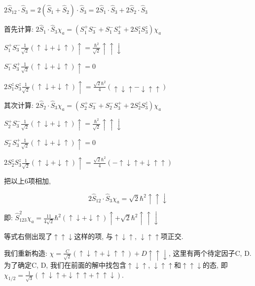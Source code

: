 $ 2 \hat S_{12}\cdot\hat S_3 = 2(\hat S_1 + \hat S_2) \cdot \hat S_3
= 2 \hat S_1 \cdot \hat S_3 + 2 \hat S_2 \cdot \hat S_3$

首先计算: $2 \hat S_1 \cdot \hat S_3 \chi_a =\left( S_1^+ S_3^- +
S_1^-S_3^+ + 2 S_1^z S_3^z \right) \chi_a$


$S_1^+ S_3^- \frac{1}{\sqrt 2}\left(
\uparrow\downarrow+\downarrow\uparrow \right) \uparrow  =
\frac{\hbar^2}{\sqrt 2} \uparrow \uparrow \downarrow$


$S_1^- S_3^+ \frac{1}{\sqrt 2}\left(
\uparrow\downarrow+\downarrow\uparrow \right) \uparrow = 0$

$2 S_1^z S_3^z \frac{1}{\sqrt 2}\left(
\uparrow\downarrow+\downarrow\uparrow \right) \uparrow = \frac{\sqrt
2 \hbar^2}{4} (\uparrow \downarrow \uparrow - \downarrow \uparrow
\uparrow ) $

其次计算: $2 \hat S_2 \cdot \hat S_3 \chi_a =\left( S_2^+ S_3^- +
S_2^-S_3^+ + 2 S_2^z S_3^z \right) \chi_a$

$S_2^+ S_3^- \frac{1}{\sqrt 2}\left(
\uparrow\downarrow+\downarrow\uparrow \right) \uparrow =
\frac{\hbar^2}{\sqrt 2} \uparrow \uparrow \downarrow$

$S_2^-S_3^+ \frac{1}{\sqrt 2}\left(
\uparrow\downarrow+\downarrow\uparrow \right) \uparrow =0 $

$2 S_2^z S_3^z \frac{1}{\sqrt 2}\left(
\uparrow\downarrow+\downarrow\uparrow \right) \uparrow = \frac{\sqrt
2 \hbar^2}{4} (- \uparrow \downarrow \uparrow + \downarrow \uparrow
\uparrow )$

把以上6项相加,

\begin{equation*}
2 \hat S_{12}\cdot \hat S_3 \chi_a = \sqrt 2 \hbar^2 \uparrow
\uparrow \downarrow
\end{equation*}

即: $\hat S_{123}^2 \chi_a = \frac{11}{4 \sqrt 2}\hbar^2 \left(
\uparrow\downarrow+\downarrow\uparrow \right) \uparrow + \sqrt 2
\hbar^2 \uparrow \uparrow \downarrow$

等式右侧出现了$\uparrow \uparrow \downarrow$这样的项,
与$\uparrow\downarrow\uparrow$, $\downarrow\uparrow\uparrow$项正交.

我们重新构造: $\chi  = \frac{C} {{\sqrt 2 }}\left( { \uparrow
\downarrow  \uparrow  +  \downarrow  \uparrow  \uparrow } \right) +
D \uparrow  \uparrow  \downarrow $, 这里有两个待定因子C, D.
为了确定C, D, 我们在前面的解中找包含$\uparrow\downarrow\uparrow$,
$\downarrow\uparrow\uparrow$和$\uparrow \uparrow \downarrow$的态,
即$\chi_{1/2}=\frac{1}{\sqrt 3}(\uparrow\downarrow\uparrow +
\downarrow\uparrow\uparrow + \uparrow \uparrow \downarrow)$.

